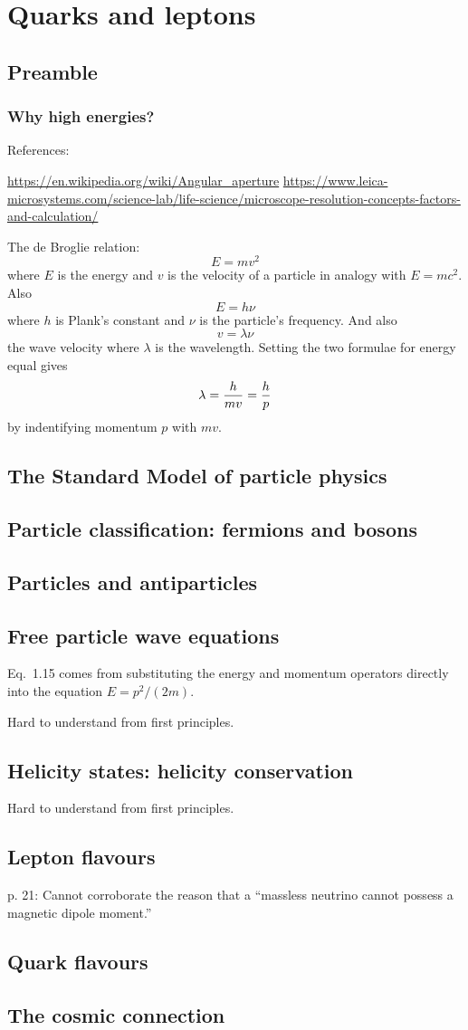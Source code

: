 \documentclass{book}
\begin{document}
\chapter{Quarks and leptons}

\section{Preamble}

\subsection{Why high energies?}

References:

\url{https://en.wikipedia.org/wiki/Angular\_aperture}
\url{https://www.leica-microsystems.com/science-lab/life-science/microscope-resolution-concepts-factors-and-calculation/}

The de Broglie relation:
$$
E = mv^2
$$
where $E$ is the energy and $v$ is the velocity of a particle in analogy with $E=mc^2$. Also
$$
E = h\nu
$$
where $h$ is Plank's constant and $\nu$ is the particle's frequency. And also
$$
v = \lambda\nu
$$
the wave velocity where $\lambda$ is the wavelength. Setting the two formulae for energy equal gives
$$
\lambda = {h \over mv} = {h \over p}
$$
by indentifying momentum $p$ with $mv$.

\section{The Standard Model of particle physics}
\section{Particle classification: fermions and bosons}
\section{Particles and antiparticles}
\section{Free particle wave equations}
Eq.\ 1.15 comes from substituting the energy and momentum operators directly into the equation $E = p^2/(2m)$.

Hard to understand from first principles.

\section{Helicity states: helicity conservation}

Hard to understand from first principles.

\section{Lepton flavours}

p. 21: Cannot corroborate the reason that a ``massless neutrino cannot possess a magnetic dipole moment.''

\section{Quark flavours}
\section{The cosmic connection}
\end{document}

